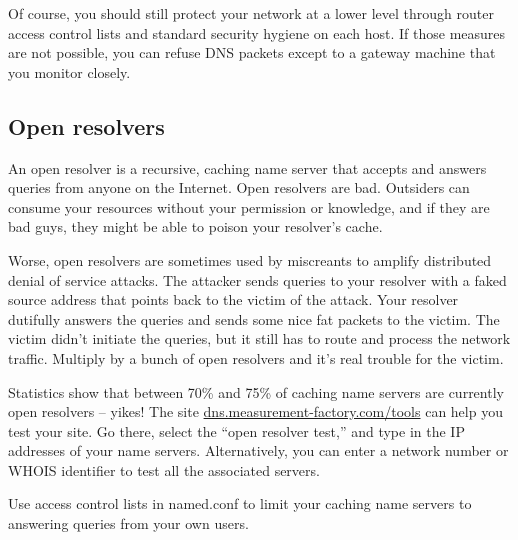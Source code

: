 Of course, you should still protect your network at a lower level
through router access control lists and standard security hygiene on
each host. If those measures are not possible, you can refuse DNS
packets except to a gateway machine that you monitor closely.

\protect\hypertarget{part0024_split_055.html}{}{}

\hypertarget{part0024_split_055.htmlux5cux23_idContainer1069}{}
\hypertarget{part0024_split_055.htmlux5cux23calibre_pb_54}{%
\subsection[Open
resolvers]{\texorpdfstring{\protect\hypertarget{part0024_split_055.htmlux5cux23_idTextAnchor934}{}{}Open
resolvers}{Open resolvers}}\label{part0024_split_055.htmlux5cux23calibre_pb_54}}

\protect\hypertarget{part0024_split_055.htmlux5cux23_idIndexMarker2241}{}{}\protect\hypertarget{part0024_split_055.htmlux5cux23_idIndexMarker2242}{}{}An
open resolver is a recursive, caching name server that accepts and
answers queries from anyone on the Internet. Open resolvers are bad.
Outsiders can consume your resources without your permission or
knowledge, and if they are bad guys, they might be able to poison your
resolver's cache.

Worse, open resolvers are sometimes used by miscreants to amplify
distributed
\protect\hypertarget{part0024_split_055.htmlux5cux23_idIndexMarker2243}{}{}denial
of service attacks. The attacker sends queries to your resolver with a
faked source address that points back to the victim of the attack. Your
resolver dutifully answers the queries and sends some nice fat packets
to the victim. The victim didn't initiate the queries, but it still has
to route and process the network traffic. Multiply by a bunch of open
resolvers and it's real trouble for the victim.

Statistics show that between 70\% and 75\% of caching name servers are
currently open resolvers -- yikes! The site
\href{http://dns.measurement-factory.com/tools}{dns.measurement-factory.com/tools}
can help you test your site. Go there, select the ``open resolver
test,'' and type in the IP addresses of your name servers.
Alternatively, you can enter a network number or WHOIS identifier to
test all the associated servers.

Use access control lists in {named.conf} to limit your caching name
servers to answering queries from your own users.

